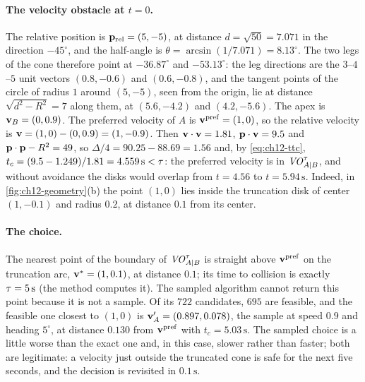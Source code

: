 \paragraph{The velocity obstacle at $t=0$.}
The relative position is $\mathbf{p}_{\mathrm{rel}} = (5,-5)$, at distance
$d = \sqrt{50} = 7.071$ in the direction $-45^\circ$, and the half-angle is
$\theta = \arcsin(1/7.071) = 8.13^\circ$. The two legs of the cone therefore
point at $-36.87^\circ$ and $-53.13^\circ$: the leg directions are the
$3$--$4$--$5$ unit vectors $(0.8,-0.6)$ and $(0.6,-0.8)$, and the tangent
points of the circle of radius $1$ around $(5,-5)$, seen from the origin, lie
at distance $\sqrt{d^2-R^2} = 7$ along them, at $(5.6,-4.2)$ and
$(4.2,-5.6)$. The apex is
$\mathbf{v}_B = (0, 0.9)$. The preferred velocity of $A$ is
$\mathbf{v}^{\mathrm{pref}} = (1, 0)$, so the relative velocity is
$\mathbf{v} = (1,0)-(0,0.9) = (1,-0.9)$. Then $\mathbf{v}\cdot\mathbf{v} = 1.81$,
$\mathbf{p}\cdot\mathbf{v} = 9.5$ and $\mathbf{p}\cdot\mathbf{p} - R^2 = 49$, so
$\Delta/4 = 90.25 - 88.69 = 1.56$ and, by \cref{eq:ch12-ttc},
$t_c = (9.5 - 1.249)/1.81 = 4.559\,\mathrm{s} < \tau$: the preferred velocity
is in $\mathit{VO}^{\tau}_{A|B}$, and without avoidance the disks would overlap from
$t = 4.56$ to $t = 5.94\,\mathrm{s}$.
Indeed, in \cref{fig:ch12-geometry}(b) the point $(1,0)$ lies inside the
truncation disk of center $(1,-0.1)$ and radius $0.2$, at distance $0.1$ from
its center.

\paragraph{The choice.}
The nearest point of the boundary of $\mathit{VO}^{\tau}_{A|B}$ is straight above
$\mathbf{v}^{\mathrm{pref}}$ on the truncation arc, $\mathbf{v}^* = (1, 0.1)$, at distance
$0.1$; its time to collision is exactly $\tau = 5\,\mathrm{s}$ (the method
 computes it). The sampled algorithm cannot
return this point because it is not a sample. Of its $722$ candidates, $695$
are feasible, and the feasible one closest to $(1,0)$ is
$\mathbf{v}_A' = (0.897, 0.078)$, the sample at speed $0.9$ and heading $5^\circ$,
at distance $0.130$ from $\mathbf{v}^{\mathrm{pref}}$ with $t_c = 5.03\,\mathrm{s}$.
The sampled choice is a little worse than the exact one and, in this case,
slower rather than faster; both are legitimate: a velocity just outside the
truncated cone is safe for the next five seconds, and the decision is
revisited in $0.1\,\mathrm{s}$.

